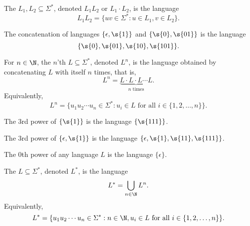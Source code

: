 \begin{definition} \label{definition:Concatenation-of-languages}
The  $L_1, L_2 \subseteq \Sigma^*$, denoted $L_1L_2$ or $L_1 \cdot L_2$, is the language
\[
    L_1L_2 = \{uv \in \Sigma^* : u \in L_1, v \in L_2\}.
\]
\end{definition}

\begin{example} \label{example:Concatenation-of-epsilon-1-and-0-01}
The concatenation of languages $\{\epsilon, \s{1}\}$ and $\{\s{0}, \s{01}\}$ is the language
\[
    \{\s{0}, \s{01}, \s{10}, \s{101}\}.
\] 
\end{example}

\begin{definition} \label{definition:Powers-of-a-language}
For $n \in \N$, the $n$'th  $L \subseteq \Sigma^*$, denoted $L^n$, is the language obtained by concatenating $L$ with itself $n$ times, that is,
\[
    L^n = \underbrace{L \cdot L \cdot L \cdots L}_{n \text{ times}}.
\]
Equivalently, 
\[
    L^n = \{u_1u_2\cdots u_n \in \Sigma^* : u_i \in L \text{ for all } i \in \{1,2,\ldots,n\}\}.
\] 
\end{definition}

\begin{example}[$\{1\}^3$] \label{example:13}
The 3rd power of $\{\s{1}\}$ is the language $\{\s{111}\}$.
\end{example}

\begin{example}[$\{\epsilon, 1\}^3$] \label{example:epsilon-13}
The 3rd power of $\{\epsilon, \s{1}\}$ is the language $\{\epsilon, \s{1}, \s{11}, \s{111}\}$.
\end{example}

\begin{example}[$L^0$] \label{example:L0}
The 0th power of any language $L$ is the language $\{\epsilon\}$.
\end{example}

\begin{definition} \label{definition:Star-operation-on-a-language}
The  $L \subseteq \Sigma^*$, denoted $L^*$, is the language 
\[
L^* = \bigcup_{n \in \N} L^n.
\]
Equivalently, 
\[
L^* = \{u_1u_2\cdots u_n \in \Sigma^* : n \in \N, u_i \in L \text{ for all } i \in \{1,2,\ldots,n\}\}.
\]
\end{definition}

